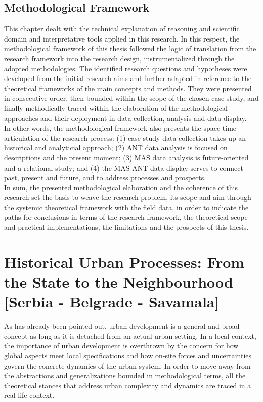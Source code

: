 \documentclass[11pt]{report}
\begin{document}
\section{Methodological Framework}

This chapter dealt with the technical explanation of reasoning and scientific domain and interpretative tools applied in this research. In this respect, the methodological framework of this thesis followed the logic of translation from the research framework into the research design, instrumentalized through the adopted methodologies. The identified research questions and hypotheses were developed from the initial research aims and further adapted in reference to the theoretical frameworks of the main concepts and methods. They were presented in consecutive order, then bounded within the scope of the chosen case study, and finally methodically traced within the elaboration of the methodological approaches and their deployment in data collection, analysis and data display.
\\

In other words, the methodological framework also presents the space-time articulation of the research process: (1) case study data collection takes up an historical and analyticial approach; (2) ANT data analysis is focused on descriptions and the present moment; (3) MAS data analysis is future-oriented and a relational study; and (4) the MAS-ANT data display serves to connect past, present and future, and to address processes and prospects.
\\

In sum, the presented methodological elaboration and the coherence of this research set the basis to weave the research problem, its scope and aim through the systemic theoretical framework with the field data, in order to indicate the paths for conclusions in terms of the research framework, the theoretical scope and practical implementations, the limitations and the prospects of this thesis.



\chapter{Historical Urban Processes: From the State to the Neighbourhood [Serbia - Belgrade - Savamala]}

As has already been pointed out, urban development is a general and broad concept as long as it is detached from an actual urban setting. In a local context, the importance of urban development is overthrown by the concern for how global aspects meet local specifications and how on-site forces and uncertainties govern the concrete dynamics of the urban system. In order to move away from the abstractions and generalizations bounded in methodological terms, all the theoretical stances that address urban complexity and dynamics are traced in a real-life context.
\\
\end{document}

